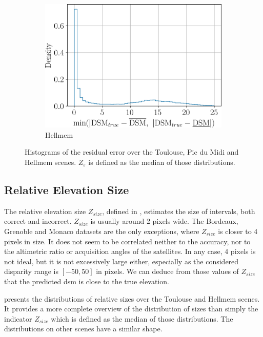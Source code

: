 \begin{figure}
\begin{subfigure}[t]{0.49\linewidth}
    \centering
        \includegraphics[width=\linewidth]{Images/Chap_6/histogram_elevation_eps_Hellmem.png}
        \caption{Hellmem}
        \label{fig:error_hist_hellmem}
    \end{subfigure}
    \caption{Histograms of the residual error over the Toulouse, Pic du Midi and Hellmem scenes. $Z_{\varepsilon}$ is defined as the median of those distributions.}
    \label{fig:histogram_elevation_error}
\end{figure}

\subsection{Relative Elevation Size}
The relative elevation size $Z_{size}$, defined in , estimates the size of intervals, both correct and incorrect. $Z_{size}$ is usually around 2 pixels wide. The Bordeaux, Grenoble and Monaco datasets are the only exceptions, where $Z_{size}$ is closer to 4 pixels in size. It does not seem to be correlated neither to the accuracy, nor to the altimetric ratio or acquisition angles of the satellites. In any case, 4 pixels is not ideal, but it is not excessively large either, especially as the considered disparity range is $[-50,50]$ in pixels. We can deduce from those values of $Z_{size}$ that the predicted \acrshort{dsm} is close to the true elevation. 

 presents the distributions of relative sizes over the Toulouse and Hellmem scenes. It provides a more complete overview of the distribution of sizes than simply the indicator $Z_{size}$ which is defined as the median of those distributions. The distributions on other scenes have a similar shape.

